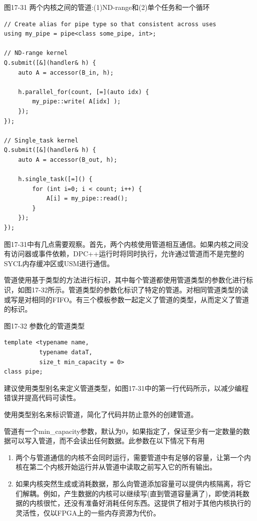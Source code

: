 \hspace*{\fill} \par %
图17-31 两个内核之间的管道:(1)ND-range和(2)单个任务和一个循环
\begin{lstlisting}[caption={}]
// Create alias for pipe type so that consistent across uses
using my_pipe = pipe<class some_pipe, int>;

// ND-range kernel
Q.submit([&](handler& h) {
	auto A = accessor(B_in, h);
	
	h.parallel_for(count, [=](auto idx) {
		my_pipe::write( A[idx] );
	});
});

// Single_task kernel
Q.submit([&](handler& h) {
	auto A = accessor(B_out, h);
	
	h.single_task([=]() {
		for (int i=0; i < count; i++) {
			A[i] = my_pipe::read();
		}
	});
});
\end{lstlisting}

图17-31中有几点需要观察。首先，两个内核使用管道相互通信。如果内核之间没有访问器或事件依赖，DPC++运行时将同时执行，允许通过管道而不是完整的SYCL内存缓冲区或USM进行通信。\par

管道使用基于类型的方法进行标识，其中每个管道都使用管道类型的参数化进行标识，如图17-32所示。管道类型的参数化标识了特定的管道。对相同管道类型的读或写是对相同的FIFO。有三个模板参数一起定义了管道的类型，从而定义了管道的标识。\par

\hspace*{\fill} \par %
图17-32 参数化的管道类型
\begin{lstlisting}[caption={}]
template <typename name,
		  typename dataT,
		  size_t min_capacity = 0>
class pipe;
\end{lstlisting}

建议使用类型别名来定义管道类型，如图17-31中的第一行代码所示，以减少编程错误并提高代码可读性。\par

\begin{tcolorbox}[colback=red!5!white,colframe=red!75!black]
使用类型别名来标识管道，简化了代码并防止意外的创建管道。
\end{tcolorbox}

管道有一个min\_capacity参数，默认为0，如果指定了，保证至少有一定数量的数据可以写入管道，而不会读出任何数据。此参数在以下情况下有用\par

\begin{enumerate}
	\item 两个与管道通信的内核不会同时运行，需要管道中有足够的容量，让第一个内核在第二个内核开始运行并从管道中读取之前写入它的所有输出。
	\item 如果内核突然生成或消耗数据，那么向管道添加容量可以提供内核隔离，将它们解耦。例如，产生数据的内核可以继续写(直到管道容量满了)，即使消耗数据的内核很忙，还没有准备好消耗任何东西。这提供了相对于其他内核执行的灵活性，仅以FPGA上的一些内存资源为代价。
\end{enumerate}

